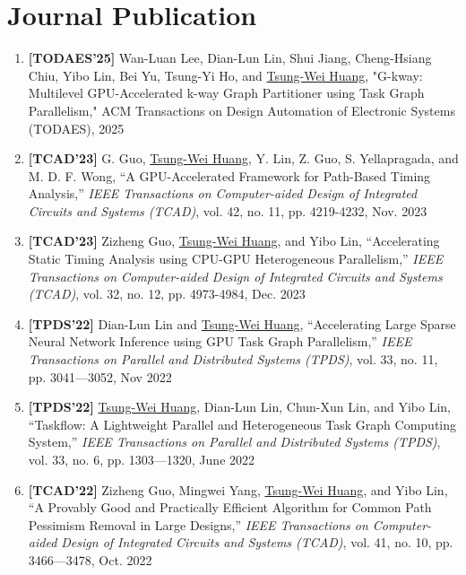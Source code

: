 \documentclass[A4,11pt]{article}
\begin{document}
\section{Journal Publication}
 \begin{enumerate}
 \itemsep-3pt

 \item \textbf{[TODAES'25]}  Wan-Luan Lee, Dian-Lun Lin, Shui Jiang, Cheng-Hsiang Chiu, Yibo Lin, Bei Yu, Tsung-Yi Ho, and \underline{Tsung-Wei Huang}, "G-kway: Multilevel GPU-Accelerated k-way Graph Partitioner using Task Graph Parallelism," ACM Transactions on Design Automation of Electronic Systems (TODAES), 2025

  \item \textbf{[TCAD'23]} G. Guo, \underline{Tsung-Wei Huang}, Y. Lin, Z. Guo, S. Yellapragada, and M. D. F. Wong, ``A GPU-Accelerated Framework for Path-Based Timing Analysis,'' \textit{IEEE Transactions on Computer-aided Design of Integrated Circuits and Systems (TCAD)}, vol. 42, no. 11, pp. 4219-4232, Nov. 2023

  \item \textbf{[TCAD'23]} Zizheng Guo, \underline{Tsung-Wei Huang}, and Yibo Lin, ``Accelerating Static Timing Analysis using CPU-GPU Heterogeneous Parallelism,'' \textit{IEEE Transactions on Computer-aided Design of Integrated Circuits and Systems (TCAD)}, vol. 32, no. 12, pp. 4973-4984, Dec. 2023

  \item \textbf{[TPDS'22]} Dian-Lun Lin and \underline{Tsung-Wei Huang}, ``Accelerating Large Sparse Neural Network Inference using GPU Task Graph Parallelism,'' \textit{IEEE Transactions on Parallel and Distributed Systems (TPDS)}, vol. 33, no. 11, pp. 3041—3052, Nov 2022

  \item \textbf{[TPDS'22]} \underline{Tsung-Wei Huang}, Dian-Lun Lin, Chun-Xun Lin, and Yibo Lin, ``Taskflow: A Lightweight Parallel and Heterogeneous Task Graph Computing System,'' \textit{IEEE Transactions on Parallel and Distributed Systems (TPDS)}, vol. 33, no. 6, pp. 1303—1320, June 2022

  \item \textbf{[TCAD'22]} Zizheng Guo, Mingwei Yang, \underline{Tsung-Wei Huang}, and Yibo Lin, ``A Provably Good and Practically Efficient Algorithm for Common Path Pessimism Removal in Large Designs,'' \textit{IEEE Transactions on Computer-aided Design of Integrated Circuits and Systems (TCAD)}, vol. 41, no. 10, pp. 3466—3478, Oct. 2022


\end{enumerate}
\end{document}

